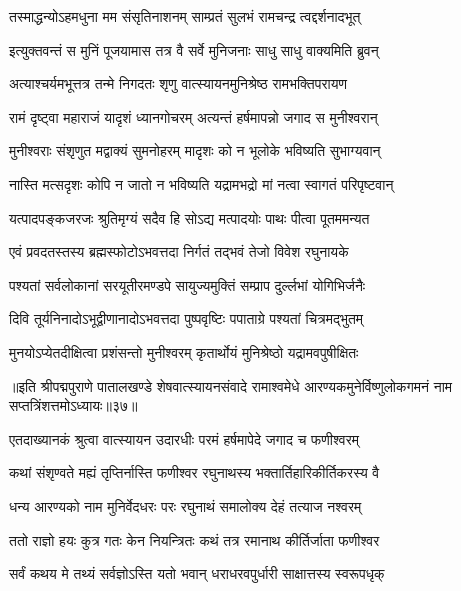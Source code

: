\twolineshloka
{तस्माद्धन्योऽहमधुना मम संसृतिनाशनम्}
{साम्प्रतं सुलभं रामचन्द्र त्वद्दर्शनादभूत्}%

\twolineshloka
{इत्युक्तवन्तं स मुनिं पूजयामास तत्र वै}
{सर्वे मुनिजनाः साधु साधु वाक्यमिति ब्रुवन्}%


\twolineshloka
{अत्याश्चर्यमभूत्तत्र तन्मे निगदतः शृणु}
{वात्स्यायनमुनिश्रेष्ठ रामभक्तिपरायण}%

\twolineshloka
{रामं दृष्ट्वा महाराजं यादृशं ध्यानगोचरम्}
{अत्यन्तं हर्षमापन्नो जगाद स मुनीश्वरान्}%

\twolineshloka
{मुनीश्वराः संशृणुत मद्वाक्यं सुमनोहरम्}
{मादृशः को न भूलोके भविष्यति सुभाग्यवान्}%

\twolineshloka
{नास्ति मत्सदृशः कोपि न जातो न भविष्यति}
{यद्रामभद्रो मां नत्वा स्वागतं परिपृष्टवान्}%

\twolineshloka
{यत्पादपङ्कजरजः श्रुतिमृग्यं सदैव हि}
{सोऽद्य मत्पादयोः पाथः पीत्वा पूतममन्यत}%

\twolineshloka
{एवं प्रवदतस्तस्य ब्रह्मस्फोटोऽभवत्तदा}
{निर्गतं तद्भवं तेजो विवेश रघुनायके}%

\twolineshloka
{पश्यतां सर्वलोकानां सरयूतीरमण्डपे}
{सायुज्यमुक्तिं सम्प्राप दुर्ल्लभां योगिभिर्जनैः}%

\twolineshloka
{दिवि तूर्यनिनादोऽभूद्वीणानादोऽभवत्तदा}
{पुष्पवृष्टिः पपाताग्रे पश्यतां चित्रमद्भुतम्}%

\twolineshloka
{मुनयोऽप्येतदीक्षित्वा प्रशंसन्तो मुनीश्वरम्}
{कृतार्थोयं मुनिश्रेष्ठो यद्रामवपुषीक्षितः}%

{॥इति श्रीपद्मपुराणे पातालखण्डे शेषवात्स्यायनसंवादे रामाश्वमेधे आरण्यकमुनेर्विष्णुलोकगमनं नाम सप्तत्रिंशत्तमोऽध्यायः॥३७॥}

\resetShloka


\twolineshloka
{एतदाख्यानकं श्रुत्वा वात्स्यायन उदारधीः}
{परमं हर्षमापेदे जगाद च फणीश्वरम्}%


\twolineshloka
{कथां संशृण्वते मह्यं तृप्तिर्नास्ति फणीश्वर}
{रघुनाथस्य भक्तार्तिहारिकीर्तिकरस्य वै}%

\twolineshloka
{धन्य आरण्यको नाम मुनिर्वेदधरः परः}
{रघुनाथं समालोक्य देहं तत्याज नश्वरम्}%

\twolineshloka
{ततो राज्ञो हयः कुत्र गतः केन नियन्त्रितः}
{कथं तत्र रमानाथ कीर्तिर्जाता फणीश्वर}%

\twolineshloka
{सर्वं कथय मे तथ्यं सर्वज्ञोऽस्ति यतो भवान्}
{धराधरवपुर्धारी साक्षात्तस्य स्वरूपधृक्}%


